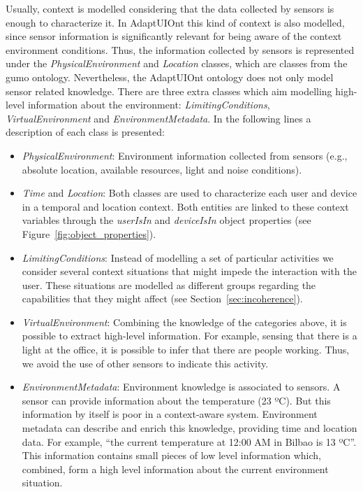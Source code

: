 Usually, context is modelled considering that the data collected by sensors is
enough to characterize it. In AdaptUIOnt this kind of context is also modelled,
since sensor information is significantly relevant for being aware of the context
environment conditions. Thus, the information collected by sensors is represented
under the \textit{PhysicalEnvironment} and \textit{Location} classes, which are
classes from the \ac{gumo} ontology. Nevertheless,
the AdaptUIOnt ontology does not only model sensor related knowledge. There are
three extra classes which aim modelling high-level information about the
environment: \textit{LimitingConditions}, \textit{VirtualEnvironment} and
\textit{EnvironmentMetadata}. In the following lines a description of each class
is presented:

\begin{itemize}
 \item \textit{PhysicalEnvironment}: Environment information collected from
 sensors (e.g., absolute location, available resources, light and noise conditions).
 
 \item \textit{Time} and \textit{Location}: Both classes are used to characterize
 each user and device in a temporal and location context. Both entities are linked
 to these context variables through the \textit{userIsIn} and \textit{deviceIsIn}
 object properties (see Figure~\ref{fig:object_properties}).
 
 \item \textit{LimitingConditions}: Instead of modelling a set of particular
 activities we consider several context situations that might impede the interaction
 with the user. These situations are modelled as different groups regarding the
 capabilities that they might affect (see Section~\ref{sec:incoherence}).
 
 \item \textit{VirtualEnvironment}: Combining the knowledge of the categories
 above, it is possible to extract high-level information. For example, sensing
 that there is a light at the office, it is possible to infer that there are
 people working. Thus, we avoid the use of other sensors to indicate this
 activity.
 
 \item \textit{EnvironmentMetadata}: Environment knowledge is associated to
 sensors. A sensor can provide information about the temperature (23 ºC). But
 this information by itself is poor in a context-aware system. Environment metadata
 can describe and enrich this knowledge, providing time and location data. For
 example, ``the current temperature at 12:00 AM in Bilbao is 13 ºC''. This information
 contains small pieces of low level information which, combined, form a high level
 information about the current environment situation.
\end{itemize}


